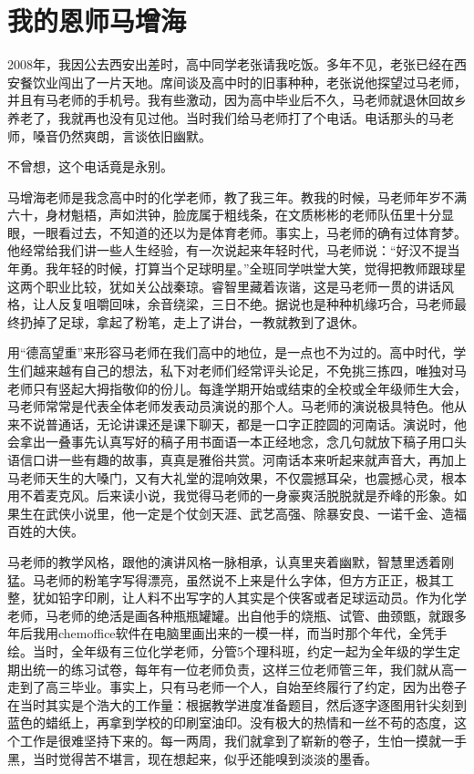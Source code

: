 \documentclass[openany]{ctexbook}
\begin{document}
\appendix {}


\chapter*{我的恩师马增海}\label{master_ma}

2008年，我因公去西安出差时，高中同学老张请我吃饭。多年不见，老张已经在西安餐饮业闯出了一片天地。席间谈及高中时的旧事种种，老张说他探望过马老师，并且有马老师的手机号。我有些激动，因为高中毕业后不久，马老师就退休回故乡养老了，我就再也没有见过他。当时我们给马老师打了个电话。电话那头的马老师，嗓音仍然爽朗，言谈依旧幽默。

不曾想，这个电话竟是永别。

马增海老师是我念高中时的化学老师，教了我三年。教我的时候，马老师年岁不满六十，身材魁梧，声如洪钟，脸庞属于粗线条，在文质彬彬的老师队伍里十分显眼，一眼看过去，不知道的还以为是体育老师。事实上，马老师的确有过体育梦。他经常给我们讲一些人生经验，有一次说起来年轻时代，马老师说：``好汉不提当年勇。我年轻的时候，打算当个足球明星。''全班同学哄堂大笑，觉得把教师跟球星这两个职业比较，犹如关公战秦琼。睿智里藏着诙谐，这是马老师一贯的讲话风格，让人反复咀嚼回味，余音绕梁，三日不绝。据说也是种种机缘巧合，马老师最终扔掉了足球，拿起了粉笔，走上了讲台，一教就教到了退休。

用``德高望重''来形容马老师在我们高中的地位，是一点也不为过的。高中时代，学生们越来越有自己的想法，私下对老师们经常评头论足，不免挑三拣四，唯独对马老师只有竖起大拇指敬仰的份儿。每逢学期开始或结束的全校或全年级师生大会，马老师常常是代表全体老师发表动员演说的那个人。马老师的演说极具特色。他从来不说普通话，无论讲课还是课下聊天，都是一口字正腔圆的河南话。演说时，他会拿出一叠事先认真写好的稿子用书面语一本正经地念，念几句就放下稿子用口头语信口讲一些有趣的故事，真真是雅俗共赏。河南话本来听起来就声音大，再加上马老师天生的大嗓门，又有大礼堂的混响效果，不仅震撼耳朵，也震撼心灵，根本用不着麦克风。后来读小说，我觉得马老师的一身豪爽活脱脱就是乔峰的形象。如果生在武侠小说里，他一定是个仗剑天涯、武艺高强、除暴安良、一诺千金、造福百姓的大侠。

马老师的教学风格，跟他的演讲风格一脉相承，认真里夹着幽默，智慧里透着刚猛。马老师的粉笔字写得漂亮，虽然说不上来是什么字体，但方方正正，极其工整，犹如铅字印刷，让人料不出写字的人其实是个侠客或者足球运动员。作为化学老师，马老师的绝活是画各种瓶瓶罐罐。出自他手的烧瓶、试管、曲颈甑，就跟多年后我用chemoffice软件在电脑里画出来的一模一样，而当时那个年代，全凭手绘。当时，全年级有三位化学老师，分管5个理科班，约定一起为全年级的学生定期出统一的练习试卷，每年有一位老师负责，这样三位老师管三年，我们就从高一走到了高三毕业。事实上，只有马老师一个人，自始至终履行了约定，因为出卷子在当时其实是个浩大的工作量：根据教学进度准备题目，然后逐字逐图用针尖刻到蓝色的蜡纸上，再拿到学校的印刷室油印。没有极大的热情和一丝不苟的态度，这个工作是很难坚持下来的。每一两周，我们就拿到了崭新的卷子，生怕一摸就一手黑，当时觉得苦不堪言，现在想起来，似乎还能嗅到淡淡的墨香。
\end{document}
